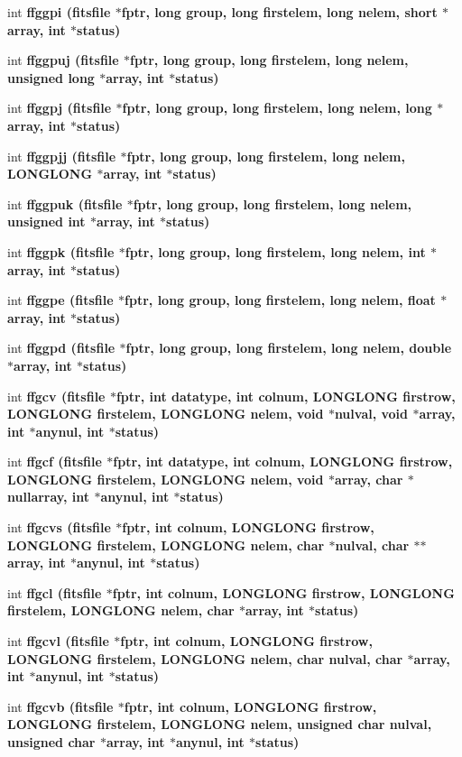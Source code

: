 \begin{CompactItemize}
int \bf{ffggpi} (\bf{fitsfile} $\ast$fptr, long group, long firstelem, long nelem, short $\ast$array, int $\ast$status)
\item 
int \bf{ffggpuj} (\bf{fitsfile} $\ast$fptr, long group, long firstelem, long nelem, unsigned long $\ast$array, int $\ast$status)
\item 
int \bf{ffggpj} (\bf{fitsfile} $\ast$fptr, long group, long firstelem, long nelem, long $\ast$array, int $\ast$status)
\item 
int \bf{ffggpjj} (\bf{fitsfile} $\ast$fptr, long group, long firstelem, long nelem, \bf{LONGLONG} $\ast$array, int $\ast$status)
\item 
int \bf{ffggpuk} (\bf{fitsfile} $\ast$fptr, long group, long firstelem, long nelem, unsigned int $\ast$array, int $\ast$status)
\item 
int \bf{ffggpk} (\bf{fitsfile} $\ast$fptr, long group, long firstelem, long nelem, int $\ast$array, int $\ast$status)
\item 
int \bf{ffggpe} (\bf{fitsfile} $\ast$fptr, long group, long firstelem, long nelem, float $\ast$array, int $\ast$status)
\item 
int \bf{ffggpd} (\bf{fitsfile} $\ast$fptr, long group, long firstelem, long nelem, double $\ast$array, int $\ast$status)
\item 
int \bf{ffgcv} (\bf{fitsfile} $\ast$fptr, int \bf{datatype}, int colnum, \bf{LONGLONG} firstrow, \bf{LONGLONG} firstelem, \bf{LONGLONG} nelem, void $\ast$nulval, void $\ast$array, int $\ast$anynul, int $\ast$status)
\item 
int \bf{ffgcf} (\bf{fitsfile} $\ast$fptr, int \bf{datatype}, int colnum, \bf{LONGLONG} firstrow, \bf{LONGLONG} firstelem, \bf{LONGLONG} nelem, void $\ast$array, char $\ast$nullarray, int $\ast$anynul, int $\ast$status)
\item 
int \bf{ffgcvs} (\bf{fitsfile} $\ast$fptr, int colnum, \bf{LONGLONG} firstrow, \bf{LONGLONG} firstelem, \bf{LONGLONG} nelem, char $\ast$nulval, char $\ast$$\ast$array, int $\ast$anynul, int $\ast$status)
\item 
int \bf{ffgcl} (\bf{fitsfile} $\ast$fptr, int colnum, \bf{LONGLONG} firstrow, \bf{LONGLONG} firstelem, \bf{LONGLONG} nelem, char $\ast$array, int $\ast$status)
\item 
int \bf{ffgcvl} (\bf{fitsfile} $\ast$fptr, int colnum, \bf{LONGLONG} firstrow, \bf{LONGLONG} firstelem, \bf{LONGLONG} nelem, char nulval, char $\ast$array, int $\ast$anynul, int $\ast$status)
\item 
int \bf{ffgcvb} (\bf{fitsfile} $\ast$fptr, int colnum, \bf{LONGLONG} firstrow, \bf{LONGLONG} firstelem, \bf{LONGLONG} nelem, unsigned char nulval, unsigned char $\ast$array, int $\ast$anynul, int $\ast$status)
$$
\end{CompactItemize}
